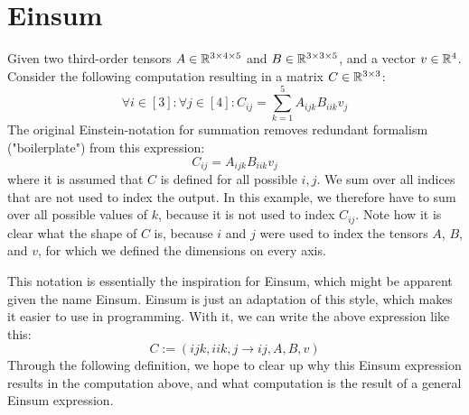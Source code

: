 \chapter{Einsum}
\label{chap:einsum}

Given two third-order tensors $A \in \mathbb{R}^{3 \times 4 \times 5}$ and $B \in \mathbb{R}^{3 \times 3 \times 5}$, and a vector $v \in \mathbb{R}^4$.
Consider the following computation resulting in a matrix $C \in \mathbb{R}^{3 \times 3}$:
$$\forall i \in [3]: \forall j \in [4]: C_{ij} = \sum\limits_{k = 1}^{5} A_{ijk} B_{iik} v_j$$
The original Einstein-notation for summation removes redundant formalism ("boilerplate") from this expression:
$$C_{ij} = A_{ijk} B_{iik} v_j$$
where it is assumed that $C$ is defined for all possible $i,j$.
We sum over all indices that are not used to index the output.
In this example, we therefore have to sum over all possible values of $k$, because it is not used to index $C_{ij}$.
Note how it is clear what the shape of $C$ is, because $i$ and $j$ were used to index the tensors $A$, $B$, and $v$,
for which we defined the dimensions on every axis.

This notation is essentially the inspiration for Einsum, which might be apparent given the name Einsum.
Einsum is just an adaptation of this style, which makes it easier to use in programming.
With it, we can write the above expression like this:
$$C := (ijk, iik, j \rightarrow ij, A, B, v)$$
Through the following definition, we hope to clear up why this Einsum expression results in the computation above,
and what computation is the result of a general Einsum expression.



